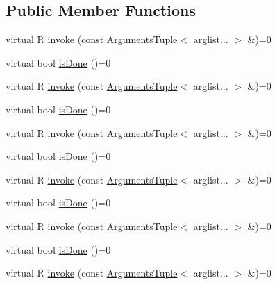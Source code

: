 \subsection*{Public Member Functions}
\begin{DoxyCompactItemize}
\item 
virtual R \mbox{\hyperlink{structfakeit_1_1Action_a85503300bf8134ce55761db5f643b00c}{invoke}} (const \mbox{\hyperlink{namespacefakeit_a476a37a598825e1b5dd67b3a176491a1}{Arguments\+Tuple}}$<$ arglist... $>$ \&)=0
\item 
virtual bool \mbox{\hyperlink{structfakeit_1_1Action_a0b9ab2c889a54c07dcaa8efc101a5cbc}{is\+Done}} ()=0
\item 
virtual R \mbox{\hyperlink{structfakeit_1_1Action_a85503300bf8134ce55761db5f643b00c}{invoke}} (const \mbox{\hyperlink{namespacefakeit_a476a37a598825e1b5dd67b3a176491a1}{Arguments\+Tuple}}$<$ arglist... $>$ \&)=0
\item 
virtual bool \mbox{\hyperlink{structfakeit_1_1Action_a0b9ab2c889a54c07dcaa8efc101a5cbc}{is\+Done}} ()=0
\item 
virtual R \mbox{\hyperlink{structfakeit_1_1Action_a85503300bf8134ce55761db5f643b00c}{invoke}} (const \mbox{\hyperlink{namespacefakeit_a476a37a598825e1b5dd67b3a176491a1}{Arguments\+Tuple}}$<$ arglist... $>$ \&)=0
\item 
virtual bool \mbox{\hyperlink{structfakeit_1_1Action_a0b9ab2c889a54c07dcaa8efc101a5cbc}{is\+Done}} ()=0
\item 
virtual R \mbox{\hyperlink{structfakeit_1_1Action_a85503300bf8134ce55761db5f643b00c}{invoke}} (const \mbox{\hyperlink{namespacefakeit_a476a37a598825e1b5dd67b3a176491a1}{Arguments\+Tuple}}$<$ arglist... $>$ \&)=0
\item 
virtual bool \mbox{\hyperlink{structfakeit_1_1Action_a0b9ab2c889a54c07dcaa8efc101a5cbc}{is\+Done}} ()=0
\item 
virtual R \mbox{\hyperlink{structfakeit_1_1Action_a85503300bf8134ce55761db5f643b00c}{invoke}} (const \mbox{\hyperlink{namespacefakeit_a476a37a598825e1b5dd67b3a176491a1}{Arguments\+Tuple}}$<$ arglist... $>$ \&)=0
\item 
virtual bool \mbox{\hyperlink{structfakeit_1_1Action_a0b9ab2c889a54c07dcaa8efc101a5cbc}{is\+Done}} ()=0
\item 
virtual R \mbox{\hyperlink{structfakeit_1_1Action_a85503300bf8134ce55761db5f643b00c}{invoke}} (const \mbox{\hyperlink{namespacefakeit_a476a37a598825e1b5dd67b3a176491a1}{Arguments\+Tuple}}$<$ arglist... $>$ \&)=0
\item 

\end{DoxyCompactItemize}
